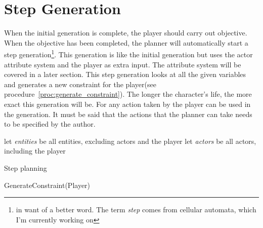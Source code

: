 \section{Step Generation}
When the initial generation is complete, the player should carry out \his objective.
When the objective has been completed, the planner will automatically start a step generation\footnote{in want of a better word.
The term \textit{step} comes from cellular automata, which I'm currently working on}.
This generation is like the initial generation but uses the actor attribute system and the player as extra input.
The attribute system will be covered in a later section.
This step generation looks at all the given variables and generates a new constraint for the player(see procedure~\ref{proc:generate_constraint}).
The longer the character's life, the more exact this generation will be.
For any action taken by the player can be used in the generation.
It must be said that the actions that the planner can take needs to be specified by the author.
\begin{algorithm}
	let \textit{entities} be all entities, excluding actors and the player\;
	let \textit{actors} be all actors, including the player\;
	\caption{Step planning}\label{alg:step_planning}
\end{algorithm}
\begin{procedure}
	\caption{GenerateConstraint(Player)}\label{proc:generate_constraint}
\end{procedure}

